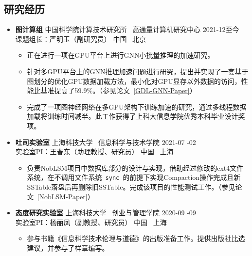 \documentclass[a4paper,10pt]{ctexart} %
\begin{document}
\begin{keepsection}
\subsection{研究经历}
\begin{itemize}
    \item \textbf{图计算组} \quad 中国科学院计算技术研究所 \, 高通量计算机研究中心 \hfill 2021-12至今 \\
    {\small 课题组长：严明玉（副研究员）} \hfill 中国 \, 北京
    \begin{small}
        \begin{itemize}
            \item 正在进行一项在GPU平台上进行GNN小批量推理的加速研究。
            \item 针对多GPU平台上的GNN推理加速问题进行研究，提出并实现了一套基于图划分的优化GPU数据加载方法，最小化对GPU显存以外数据的访问，性能比基准提高了59.9\%。（参见论文~\ref{GDL-GNN-Paper}）
            \item 完成了一项图神经网络在多GPU架构下训练加速的研究，通过多线程数据加载将训练时间减半。此工作获得了上科大信息学院优秀本科毕业设计奖项。
        \end{itemize}
    \end{small}

    \item \textbf{吐司实验室} \quad 上海科技大学 \, 信息科学与技术学院 \hfill 2021-07 -02 \\
    {\small 实验室PI：王春东（助理教授、研究员）} \hfill 中国 \, 上海
    \begin{small}
        \begin{itemize}
            \item 负责NobLSM项目中数据库部分的设计与实现，借助经过修改的ext4文件系统，在不调用文件系统~\texttt{sync}~的前提下实现Compaction操作完成且新SSTable落盘后再删除旧SSTable。完成该项目的性能测试工作。（参见论文~\ref{NobLSM-Paper}）
        \end{itemize}
    \end{small}

    \item \textbf{态度研究实验室} \quad 上海科技大学 \, 创业与管理学院 \hfill 2020-09 -09 \\
    {\small 实验室PI：杨丽凤（副教授、研究员）} \hfill 中国 \, 上海
    \begin{small}
        \begin{itemize}
            \item 参与书籍《信息科学技术伦理与道德》的出版准备工作。提供出版社比选建议，并参与了样章编写。
        \end{itemize}
    \end{small}
\end{itemize}
\end{keepsection}
\end{document}
